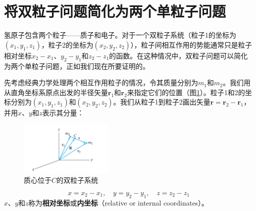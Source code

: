 \section{将双粒子问题简化为两个单粒子问题}
\label{sec:6.3 Reduction of the Two-Particle Problem to Two One-Particle Problems}
    氢原子包含两个粒子——质子和电子。对于一个双粒子系统（粒子1的坐标为$\left(x_1,y_1,z_1\right)$，粒子2的坐标为$\left(x_2,y_2,z_2\right)$），粒子间相互作用的势能通常只是粒子相对坐标$x_2-x_1$、$y_2-y_1$和$z_2-z_1$的函数。在这种情况中，双粒子问题可以简化为两个单粒子问题，正如我们现在所要证明的。

    先考虑经典力学处理两个相互作用粒子的情况，令其质量分别为$m_1$和$m_2$。我们用从直角坐标系原点出发的半径矢量$\mathbf{r}_1$和$\mathbf{r}_2$来指定它们的位置（图\ref{fig:6.1}）。粒子1和2的坐标分别为$\left(x_1,y_1,z_1\right)$和$\left(x_2,y_2,z_2\right)$。我们从粒子1到粒子2画出矢量$\mathbf{r} = \mathbf{r}_2 - \mathbf{r}_1$，并用$x$、$y$和$z$表示其分量：
    \begin{figure}[ht]
        \centering
        \includegraphics[width=0.4\textwidth]{Figures/6.1.png}
        \caption{质心位于$C$的双粒子系统}
        \label{fig:6.1}
    \end{figure}
    \begin{equation}
        \boxed{
            x = x_2 - x_1, \quad y = y_2 - y_1, \quad z = z_2 - z_1
        }
        \label{eq:6.28}
    \end{equation}
    $x$、$y$和$z$称为\textbf{相对坐标}或\textbf{内坐标}（relative or internal coordinates）。

